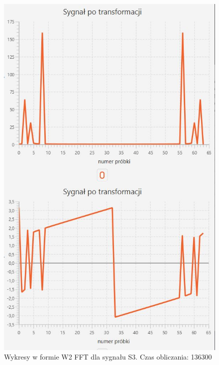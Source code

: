 \documentclass[12pt]{article}
\begin{document}
\begin{figure}[H]
	\centering
	\includegraphics[width=.8\linewidth]{FFT-S3-W2}
	\caption{Wykresy w formie W2 FFT dla sygnału S3. Czas obliczania: 136300}
	\label{S3_sygnal}
\end{figure}
\end{document}
